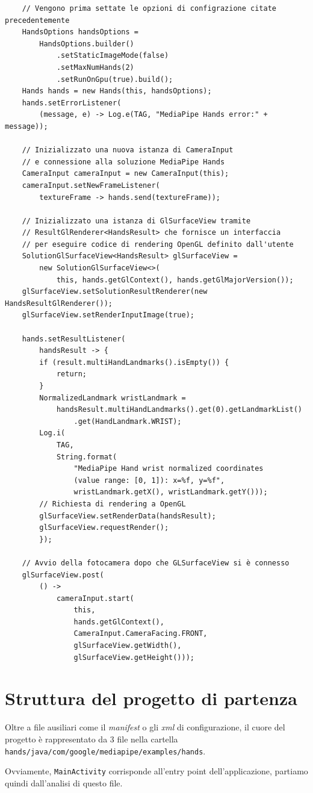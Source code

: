 \begin{verbatim}
    // Vengono prima settate le opzioni di configrazione citate precedentemente
    HandsOptions handsOptions =
        HandsOptions.builder()
            .setStaticImageMode(false)
            .setMaxNumHands(2)
            .setRunOnGpu(true).build();
    Hands hands = new Hands(this, handsOptions);
    hands.setErrorListener(
        (message, e) -> Log.e(TAG, "MediaPipe Hands error:" + message));

    // Inizializzato una nuova istanza di CameraInput
    // e connessione alla soluzione MediaPipe Hands
    CameraInput cameraInput = new CameraInput(this);
    cameraInput.setNewFrameListener(
        textureFrame -> hands.send(textureFrame));

    // Inizializzato una istanza di GlSurfaceView tramite 
    // ResultGlRenderer<HandsResult> che fornisce un interfaccia 
    // per eseguire codice di rendering OpenGL definito dall'utente
    SolutionGlSurfaceView<HandsResult> glSurfaceView =
        new SolutionGlSurfaceView<>(
            this, hands.getGlContext(), hands.getGlMajorVersion());
    glSurfaceView.setSolutionResultRenderer(new HandsResultGlRenderer());
    glSurfaceView.setRenderInputImage(true);

    hands.setResultListener(
        handsResult -> {
        if (result.multiHandLandmarks().isEmpty()) {
            return;
        }
        NormalizedLandmark wristLandmark =
            handsResult.multiHandLandmarks().get(0).getLandmarkList()
                .get(HandLandmark.WRIST);
        Log.i(
            TAG,
            String.format(
                "MediaPipe Hand wrist normalized coordinates 
                (value range: [0, 1]): x=%f, y=%f",
                wristLandmark.getX(), wristLandmark.getY()));
        // Richiesta di rendering a OpenGL
        glSurfaceView.setRenderData(handsResult);
        glSurfaceView.requestRender();
        });

    // Avvio della fotocamera dopo che GLSurfaceView si è connesso
    glSurfaceView.post(
        () ->
            cameraInput.start(
                this,
                hands.getGlContext(),
                CameraInput.CameraFacing.FRONT,
                glSurfaceView.getWidth(),
                glSurfaceView.getHeight()));

\end{verbatim}

\section{Struttura del progetto di partenza}
Oltre a file ausiliari come il \textit{manifest} o gli \textit{xml} di configurazione, il cuore del progetto è rappresentato da 3 file nella cartella \texttt{hands/java/com/google/mediapipe/examples/hands}.
\begin{figure}[H]
    \centering
\end{figure}
\noindent Ovviamente, \texttt{MainActivity} corrisponde all'entry point dell'applicazione, partiamo quindi dall'analisi di questo file.

